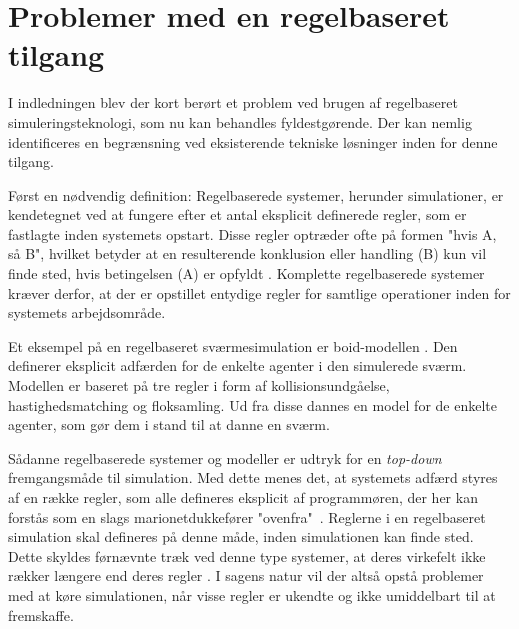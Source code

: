 \section{Problemer med en regelbaseret tilgang}


I indledningen blev der kort berørt et problem ved brugen af regelbaseret simuleringsteknologi, som nu kan behandles fyldestgørende. Der kan nemlig identificeres en begrænsning ved eksisterende tekniske løsninger inden for denne tilgang.
\par
Først en nødvendig definition: Regelbaserede systemer, herunder simulationer, er kendetegnet ved at fungere efter et antal eksplicit definerede regler, som er fastlagte inden systemets opstart. Disse regler optræder ofte på formen "hvis A, så B", hvilket betyder at en resulterende konklusion eller handling (B) kun vil finde sted, hvis betingelsen (A) er opfyldt \cite{Grosan2011}. Komplette regelbaserede systemer kræver derfor, at der er opstillet entydige regler for samtlige operationer inden for systemets arbejdsområde. 
\par
Et eksempel på en regelbaseret sværmesimulation er boid-modellen \cite{reynolds1987}. Den definerer eksplicit adfærden for de enkelte agenter i den simulerede sværm. Modellen er baseret på tre regler i form af kollisionsundgåelse, hastighedsmatching og floksamling. Ud fra disse dannes en model for de enkelte agenter, som gør dem i stand til at danne en sværm.
\par
Sådanne regelbaserede systemer og modeller er udtryk for en \textit{top-down} fremgangsmåde til simulation. Med dette menes det, at systemets adfærd styres af en række regler, som alle defineres eksplicit af programmøren, der her kan forstås som en slags marionetdukkefører "ovenfra"\ \cite{mhamdi2018}. Reglerne i en regelbaseret simulation skal defineres på denne måde, inden simulationen kan finde sted. Dette skyldes førnævnte træk ved denne type systemer, at deres virkefelt ikke rækker længere end deres regler \cite{Grosan2011}. I sagens natur vil der altså opstå problemer med at køre simulationen, når visse regler er ukendte og ikke umiddelbart til at fremskaffe.
